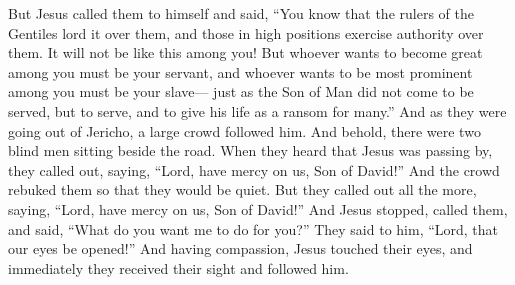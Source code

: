 \begin{biblechapter}
\verse But Jesus called them to himself and said, “You know that the rulers of the Gentiles lord it over them, and those in high positions exercise authority over them.
\verse It will not be like this among you! But whoever wants to become great among you must be your servant,
\verse and whoever wants to be most prominent among you must be your slave—
\verse just as the Son of Man did not come to be served, but to serve, and to give his life as a ransom for many.”
 And as they were going out of Jericho, a large crowd followed him.
\verse And behold, there were two blind men sitting beside the road. When they heard that Jesus was passing by, they called out, saying, “Lord, have mercy on us, Son of David!”
\verse And the crowd rebuked them so that they would be quiet. But they called out all the more, saying, “Lord, have mercy on us, Son of David!”
\verse And Jesus stopped, called them, and said, “What do you want me to do for you?”
\verse They said to him, “Lord, that our eyes be opened!”
\verse And having compassion, Jesus touched their eyes, and immediately they received their sight and followed him.
\end{biblechapter}

